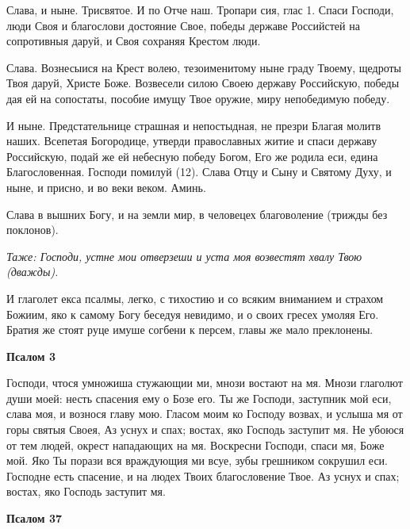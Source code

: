 Слава, и ныне. Трисвятое. И по Отче наш. Тропари сия, глас 1. Спаси Господи, люди Своя и благослови достояние Свое, победы державе Российстей на сопротивныя даруй, и Своя сохраняя Крестом люди.


Слава. Вознесыися на Крест волею, тезоименитому ныне граду Твоему, щедроты Твоя даруй, Христе Боже. Возвесели силою Своею державу Российскую, победы дая ей на сопостаты, пособие имущу Твое оружие, миру непобедимую победу.


И ныне. Предстательнице страшная и непостыдная, не презри Благая молитв наших. Всепетая Богородице, утверди православных житие и спаси державу Российскую, подай же ей небесную победу Богом, Его же родила еси, едина Благословенная. Господи помилуй (12). Слава Отцу и Сыну и Святому Духу, и ныне, и присно, и во веки веком. Аминь.


Слава в вышних Богу, и на земли мир, в человецех благоволение (трижды без поклонов).


\itshape Таже:\normalfont{} Господи, устне мои отверзеши и уста моя возвестят хвалу Твою (дважды).


И глаголет екса псалмы, легко, с тихостию и со всяким вниманием и страхом Божиим, яко к самому Богу беседуя невидимо, и о своих гресех умоляя Его. Братия же стоят руце имуше согбени к персем, главы же мало преклонены.





\bfseries Псалом 3\normalfont{}


Господи, чтося умножиша стужающии ми, мнози востают на мя. Мнози глаголют души моей: несть спасения ему о Бозе его. Ты же Господи, заступник мой еси, слава моя, и вознося главу мою. Гласом моим ко Господу возвах, и услыша мя от горы святыя Своея, Аз уснух и спах; востах, яко Господь заступит мя. Не убоюся от тем людей, окрест нападающих на мя. Воскресни Господи, спаси мя, Боже мой. Яко Ты порази вся враждующия ми всуе, зубы грешником сокрушил еси. Господне есть спасение, и на людех Твоих благословение Твое. Аз уснух и спах; востах, яко Господь заступит мя.





\bfseries Псалом 37\normalfont{}


